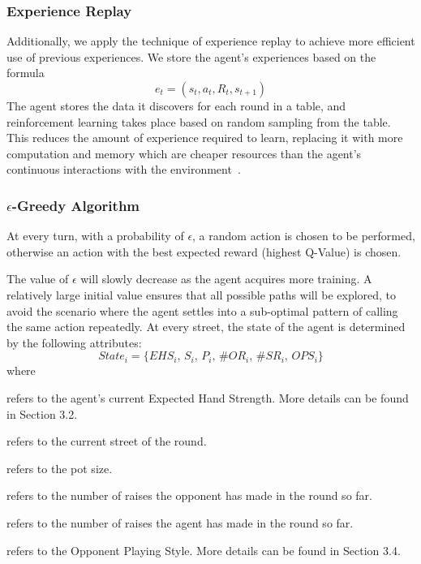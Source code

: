 \documentclass{article}
\begin{document}
\subsubsection{Experience Replay}

Additionally, we apply the technique of experience replay to achieve more efficient use of previous experiences. We store the agent's experiences based on the formula
\begin{displaymath}
e_t=\left(s_t,a_t,R_t,s_{t+1}\right)
\end{displaymath}
The agent stores the data it discovers for each round in a table, and reinforcement learning takes place based on random sampling from the table. This reduces the amount of experience required to learn, replacing it with more computation and memory which are cheaper resources than the agent's continuous interactions with the environment~\cite{sqas:replay}.

\subsubsection{$\epsilon$-Greedy Algorithm}

At every turn, with a probability of $\epsilon$, a random action is chosen to be performed, otherwise an action with the best expected reward (highest Q-Value) is chosen.

The value of $\epsilon$ will slowly decrease as the agent acquires more training. A relatively large initial value ensures that all possible paths will be explored, to avoid the scenario where the agent settles into a sub-optimal pattern of calling the same action repeatedly. At every street, the state of the agent is determined by the following attributes:
\begin{displaymath}
State_i = \{ EHS_i \text{, } S_i \text{, }P_i\text{, }\#OR_i\text{, }\#SR_i\text{, }OPS_i\}
\end{displaymath}
where

\begin{description}[style=multiline,leftmargin=10mm]
\item [\emph{EHS}]refers to the agent's current Expected Hand Strength. More details can be found in Section 3.2.
\item [\emph{S}]refers to the current street of the round.
\item [\emph{P}]refers to the pot size.
\item [\emph{\#OR}]refers to the number of raises the opponent has made in the round so far.
\item [\emph{\#SR}]refers to the number of raises the agent has made in the round so far.
\item [\emph{OPS}]refers to the Opponent Playing Style. More details can be found in Section 3.4.
\end{description}
\end{document}
